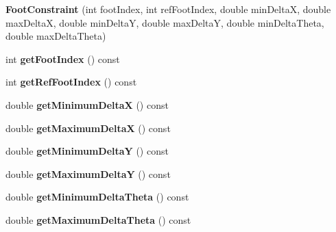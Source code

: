 \begin{DoxyCompactItemize}
\item 
\hypertarget{classfsp_1_1_foot_constraint_af959de71ebfb45b0c05049cc08bae624}{{\bfseries Foot\-Constraint} (int foot\-Index, int ref\-Foot\-Index, double min\-Delta\-X, double max\-Delta\-X, double min\-Delta\-Y, double max\-Delta\-Y, double min\-Delta\-Theta, double max\-Delta\-Theta)}\label{classfsp_1_1_foot_constraint_af959de71ebfb45b0c05049cc08bae624}

\item 
\hypertarget{classfsp_1_1_foot_constraint_af33b919d4650cf457bdcf6a96ca222af}{int {\bfseries get\-Foot\-Index} () const }\label{classfsp_1_1_foot_constraint_af33b919d4650cf457bdcf6a96ca222af}

\item 
\hypertarget{classfsp_1_1_foot_constraint_a8cbe99d87b7a4090a82397dad17125cd}{int {\bfseries get\-Ref\-Foot\-Index} () const }\label{classfsp_1_1_foot_constraint_a8cbe99d87b7a4090a82397dad17125cd}

\item 
\hypertarget{classfsp_1_1_foot_constraint_a171f504ff13cf1925b1adc167c98c7fb}{double {\bfseries get\-Minimum\-Delta\-X} () const }\label{classfsp_1_1_foot_constraint_a171f504ff13cf1925b1adc167c98c7fb}

\item 
\hypertarget{classfsp_1_1_foot_constraint_af3efb19bf66121ed9db10b4e7e0e0a4a}{double {\bfseries get\-Maximum\-Delta\-X} () const }\label{classfsp_1_1_foot_constraint_af3efb19bf66121ed9db10b4e7e0e0a4a}

\item 
\hypertarget{classfsp_1_1_foot_constraint_a761faef601330209c31118cccef3b44a}{double {\bfseries get\-Minimum\-Delta\-Y} () const }\label{classfsp_1_1_foot_constraint_a761faef601330209c31118cccef3b44a}

\item 
\hypertarget{classfsp_1_1_foot_constraint_a2cf53849b5babe58b28532d4d5a679d2}{double {\bfseries get\-Maximum\-Delta\-Y} () const }\label{classfsp_1_1_foot_constraint_a2cf53849b5babe58b28532d4d5a679d2}

\item 
\hypertarget{classfsp_1_1_foot_constraint_a19e75581383551b3b1f046d6b20ee0c6}{double {\bfseries get\-Minimum\-Delta\-Theta} () const }\label{classfsp_1_1_foot_constraint_a19e75581383551b3b1f046d6b20ee0c6}

\item 
\hypertarget{classfsp_1_1_foot_constraint_aae55e63e3eaf2354dd7ced47c51afb78}{double {\bfseries get\-Maximum\-Delta\-Theta} () const }\label{classfsp_1_1_foot_constraint_aae55e63e3eaf2354dd7ced47c51afb78}

\end{DoxyCompactItemize}



